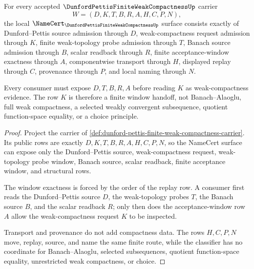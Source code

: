 \begin{theorem}
\label{thm:dunford-pettis-finite-weak-compactness-namecert-obligations}
For every accepted $\DunfordPettisFiniteWeakCompactnessUp$ carrier
$$
W=(D,K,T,B,R,A,H,C,P,N),
$$
the local $\NameCert_{\DunfordPettisFiniteWeakCompactnessUp}$ surface consists exactly of Dunford--Pettis source admission through $D$, weak-compactness request admission through $K$, finite weak-topology probe admission through $T$, Banach source admission through $B$, scalar readback through $R$, finite acceptance-window exactness through $A$, componentwise transport through $H$, displayed replay through $C$, provenance through $P$, and local naming through $N$.

Every consumer must expose $D,T,B,R,A$ before reading $K$ as weak-compactness evidence. The row $K$ is therefore a finite window handoff, not Banach--Alaoglu, full weak compactness, a selected weakly convergent subsequence, quotient function-space equality, or a choice principle.
\end{theorem}
\begin{proof}
Project the carrier of \autoref{def:dunford-pettis-finite-weak-compactness-carrier}. Its public rows are exactly $D,K,T,B,R,A,H,C,P,N$, so the NameCert surface can expose only the Dunford--Pettis source, weak-compactness request, weak-topology probe window, Banach source, scalar readback, finite acceptance window, and structural rows.

The window exactness is forced by the order of the replay row. A consumer first reads the Dunford--Pettis source $D$, the weak-topology probes $T$, the Banach source $B$, and the scalar readback $R$; only then does the acceptance-window row $A$ allow the weak-compactness request $K$ to be inspected.

Transport and provenance do not add compactness data. The rows $H,C,P,N$ move, replay, source, and name the same finite route, while the classifier has no coordinate for Banach--Alaoglu, selected subsequences, quotient function-space equality, unrestricted weak compactness, or choice.
\end{proof}

